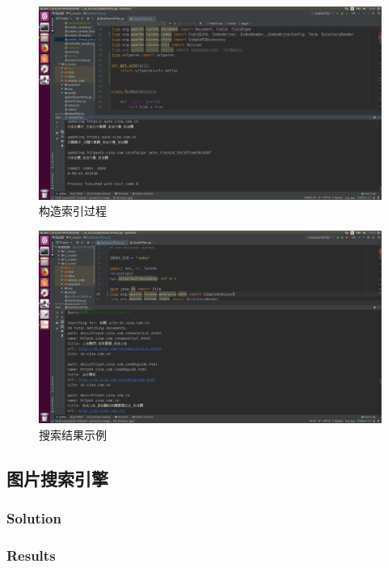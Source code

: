 \documentclass{article}
\begin{document}
\begin{figure}[htbp]
\centering
\includegraphics[width=14.5cm]{img/siteupdate.png}
\caption{构造索引过程}
\label{fig:siteindex}
\end{figure}


\begin{figure}[htbp]
\centering
\includegraphics[width=14.5cm]{img/sitesearch2.png}
\caption{搜索结果示例}
\label{fig:sitetest}
\end{figure}




\subsection{图片搜索引擎}

\subsubsection{Solution}

\subsubsection{Results}
\end{document}
